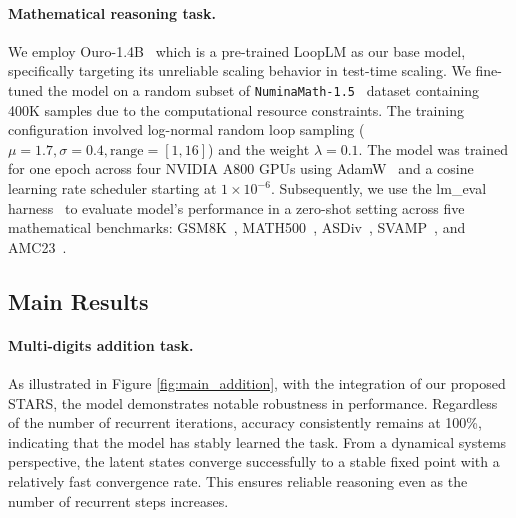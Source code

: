 \paragraph{Mathematical reasoning task.}
We employ Ouro-1.4B~\citep{zhu2025scaling} which is a pre-trained LoopLM as our base model, specifically targeting its unreliable scaling behavior in test-time scaling. We fine-tuned the model on a random subset of \texttt{NuminaMath-1.5}~\citep{li2024numinamath} dataset containing 400K samples due to the computational resource constraints. The training configuration involved log-normal random loop sampling ($\mu=1.7, \sigma=0.4, \text{range}=[1, 16]$) and the weight $\lambda=0.1$. The model was trained for one epoch across four NVIDIA A800 GPUs using AdamW~\citep{loshchilov2017decoupled} and a cosine learning rate scheduler starting at $1 \times 10^{-6}$. Subsequently, we use the lm\_eval harness~\citep{eval-harness} to evaluate model's performance in a zero-shot setting across five mathematical benchmarks: GSM8K~\citep{cobbe2021gsm8k}, MATH500~\citep{lightman2023lets}, ASDiv~\citep{miao2020diverse}, SVAMP~\citep{patel2021nlp}, and AMC23~\citep{yang2025qwen3}. 
\subsection{Main Results}
\paragraph{Multi-digits addition task.}
As illustrated in Figure \ref{fig:main_addition}, with the integration of our proposed STARS, the model demonstrates notable robustness in performance.   
Regardless of the number of recurrent iterations, accuracy consistently remains at 100\%, indicating that the model has stably learned the task.   
From a dynamical systems perspective, the latent states converge successfully to a stable fixed point with a relatively fast convergence rate.   
This ensures reliable reasoning even as the number of recurrent steps increases.



